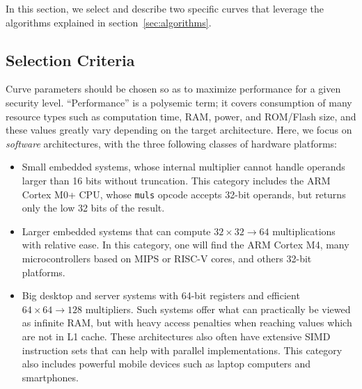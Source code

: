 \documentclass{llncs}
\begin{document}
In this section, we select and describe two specific curves that leverage the
algorithms explained in section~\ref{sec:algorithms}.

\subsection{Selection Criteria}\label{sec:curveparams:criteria}

Curve parameters should be chosen so as to maximize performance for a
given security level. ``Performance'' is a polysemic term; it covers
consumption of many resource types such as computation time, RAM, power,
and ROM/Flash size, and these values greatly vary depending on the
target architecture. Here, we focus on \emph{software} architectures,
with the three following classes of hardware platforms:
\begin{itemize}

    \item Small embedded systems, whose internal multiplier cannot
    handle operands larger than 16 bits without truncation. This category
    includes the ARM Cortex M0+ CPU, whose \verb+muls+ opcode accepts
    32-bit operands, but returns only the low 32 bits of the result.

    \item Larger embedded systems that can compute
    $32\times 32\rightarrow 64$ multiplications with relative ease. In
    this category, one will find the ARM Cortex M4, many microcontrollers
    based on MIPS or RISC-V cores, and others 32-bit platforms.

    \item Big desktop and server systems with 64-bit registers and
    efficient $64\times 64\rightarrow 128$ multipliers. Such systems
    offer what can practically be viewed as infinite RAM, but with heavy
    access penalties when reaching values which are not in L1 cache.
    These architectures also often have extensive SIMD instruction sets
    that can help with parallel implementations. This category also
    includes powerful mobile devices such as laptop computers and
    smartphones.

\end{itemize}
\end{document}
